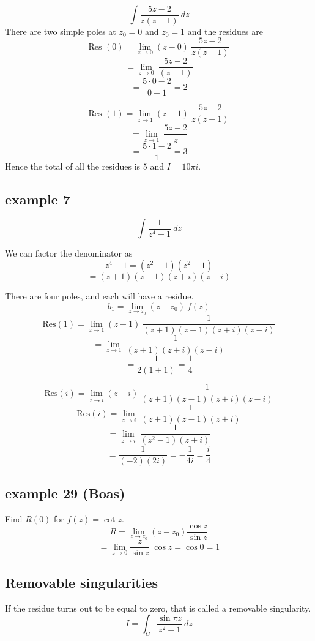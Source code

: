 \documentclass[11pt, oneside]{article}
\begin{document}
\label{sec:ex12R}

\[ \int \frac{5z-2}{z(z-1)} \ dz \]
There are two simple poles at $z_0 = 0$ and $z_0 = 1$ and the residues are
\[ \text{Res }(0) = \lim_{z \rightarrow 0} (z - 0) \ \frac{5z-2}{z(z-1)} \]
\[ = \lim_{z \rightarrow 0} \ \frac{5z-2}{(z-1)} \]
\[ = \frac{5 \cdot 0 - 2}{0 - 1} = 2 \]

\[ \text{Res }(1) = \lim_{z \rightarrow 1} (z - 1) \ \frac{5z-2}{z(z-1)} \]
\[ = \lim_{z \rightarrow 1} \ \frac{5z-2}{z} \]
\[ = \frac{5 \cdot 1 - 2}{1} = 3 \]
Hence the total of all the residues is $5$ and $I = 10 \pi i$.

\subsection*{example 7}

\label{sec:ex7R}

\[ \int \frac{1}{z^4 - 1} \ dz \]

We can factor the denominator as
\[ z^4 - 1 = (z^2 - 1)(z^2 + 1) \]
\[ = (z+1)(z-1)(z+i)(z-i) \]

There are four poles, and each will have a residue.
\[ b_1 = \lim_{z \rightarrow z_0} (z-z_0) \ f(z)  \]
\[ \text{Res}(1) =  \lim_{z \rightarrow 1} (z-1) \ \frac{1}{(z+1)(z-1)(z+i)(z-i)} \]
\[ =  \lim_{z \rightarrow 1} \ \frac{1}{(z+1)(z+i)(z-i)} \]
\[ = \frac{1}{2(1+1)} = \frac{1}{4} \]

\[ \text{Res}(i) =  \lim_{z \rightarrow i} (z-i) \ \frac{1}{(z+1)(z-1)(z+i)(z-i)} \]
\[ \text{Res}(i) =  \lim_{z \rightarrow i} \ \frac{1}{(z+1)(z-1)(z+i)} \]
\[ =  \lim_{z \rightarrow i} \ \frac{1}{(z^2 - 1)(z+i)} \]
\[ = \frac{1}{(-2)(2i)} = -\frac{1}{4i} = \frac{i}{4}  \]

\subsection*{example 29 (Boas)}

\label{sec:ex29R}

Find $R(0)$ for $f(z) = \cot z$.
\[ R = \lim_{z \rightarrow z_0} (z - z_0) \frac{\cos z}{\sin z} \]
\[ = \lim_{z \rightarrow 0} \frac{z}{\sin z} \ \cos z = \cos 0 = 1 \]

\subsection*{Removable singularities}
If the residue turns out to be equal to zero, that is called a removable singularity.  
\[ I = \int_C \frac{\sin \pi z}{z^2 - 1} \ dz \]
\end{document}
